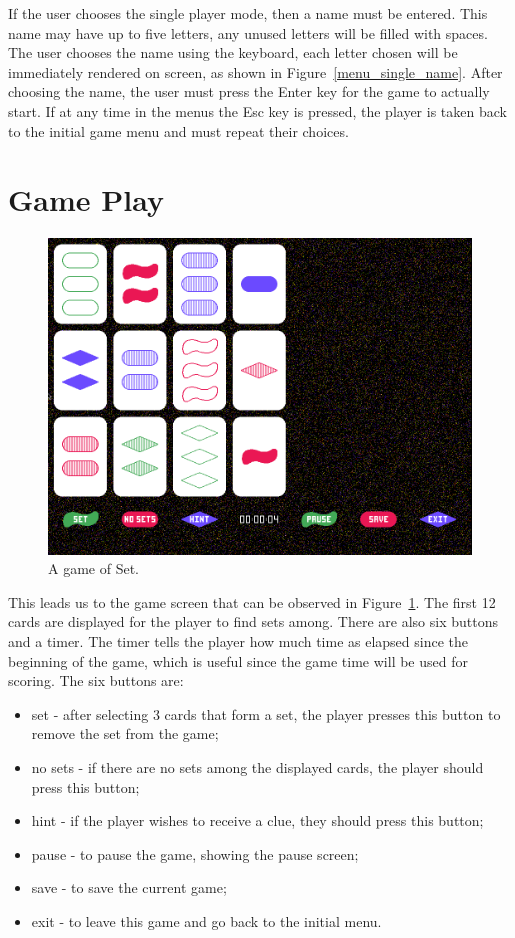 \documentclass[11pt,a4paper,reqno]{report}
\numberwithin{equation}{section}
\begin{document}
If the user chooses the single player mode, then a name must be entered. This name may have up to five letters, any unused letters will be filled with spaces. The user chooses the name using the keyboard, each letter chosen will be immediately rendered on screen, as shown in Figure~\ref{menu_single_name}. After choosing the name, the user must press the Enter key for the game to actually start. If at any time in the menus the Esc key is pressed, the player is taken back to the initial game menu and must repeat their choices.

\section{Game Play}

\begin{figure}[htbp]
\begin{center}
\includegraphics[scale=0.3]{game_play.png}
\caption{A game of Set.}
\label{game_play}
\end{center}
\end{figure}

This leads us to the game screen that can be observed in Figure~\ref{game_play}. The first 12 cards are displayed for the player to find sets among. There are also six buttons and a timer. The timer tells the player how much time as elapsed since the beginning of the game, which is useful since the game time will be used for scoring. The six buttons are:
\begin{itemize}
\item set - after selecting 3 cards that form a set, the player presses this button to remove the set from the game;
\item no sets - if there are no sets among the displayed cards, the player should press this button;
\item hint - if the player wishes to receive a clue, they should press this button;
\item pause - to pause the game, showing the pause screen;
\item save - to save the current game;
\item exit - to leave this game and go back to the initial menu.
\end{itemize}
\end{document}
